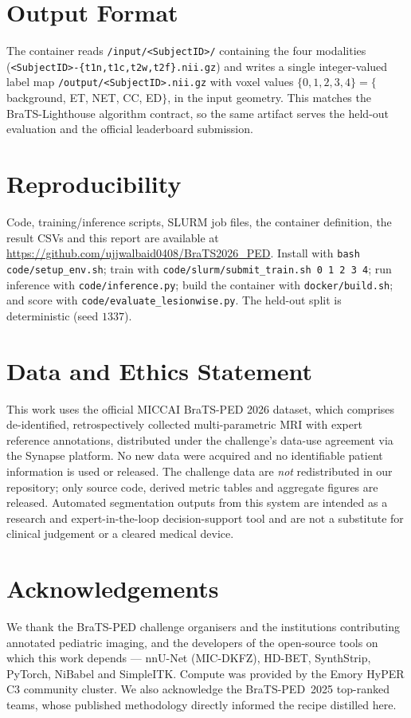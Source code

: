 \documentclass[11pt,a4paper]{article}
\begin{document}
\section{Output Format}
\label{app:fmt}
The container reads \texttt{/input/<SubjectID>/} containing the four modalities
(\texttt{<SubjectID>-\{t1n,t1c,t2w,t2f\}.nii.gz}) and writes a single integer-valued
label map \texttt{/output/<SubjectID>.nii.gz} with voxel values
$\{0,1,2,3,4\}=\{$background, ET, NET, CC, ED$\}$, in the input geometry. This matches
the BraTS-Lighthouse algorithm contract, so the same artifact serves the held-out
evaluation and the official leaderboard submission.

\section*{Reproducibility}
Code, training/inference scripts, SLURM job files, the container definition, the
result CSVs and this report are available at
\url{https://github.com/ujjwalbaid0408/BraTS2026_PED}. Install with
\texttt{bash code/setup\_env.sh}; train with \texttt{code/slurm/submit\_train.sh 0 1 2 3 4};
run inference with \texttt{code/inference.py}; build the container with
\texttt{docker/build.sh}; and score with \texttt{code/evaluate\_lesionwise.py}. The
held-out split is deterministic (seed $1337$).

\section*{Data and Ethics Statement}
This work uses the official MICCAI BraTS-PED 2026 dataset, which comprises
de-identified, retrospectively collected multi-parametric MRI with expert reference
annotations, distributed under the challenge's data-use agreement via the Synapse
platform. No new data were acquired and no identifiable patient information is used or
released. The challenge data are \emph{not} redistributed in our repository; only
source code, derived metric tables and aggregate figures are released. Automated
segmentation outputs from this system are intended as a research and
expert-in-the-loop decision-support tool and are not a substitute for clinical
judgement or a cleared medical device.

\section*{Acknowledgements}
We thank the BraTS-PED challenge organisers and the institutions contributing
annotated pediatric imaging, and the developers of the open-source tools on which this
work depends --- nnU-Net (MIC-DKFZ), HD-BET, SynthStrip, PyTorch, NiBabel and
SimpleITK. Compute was provided by the Emory HyPER C3 community cluster. We also
acknowledge the BraTS-PED~2025 top-ranked teams, whose published methodology directly
informed the recipe distilled here.
\end{document}
